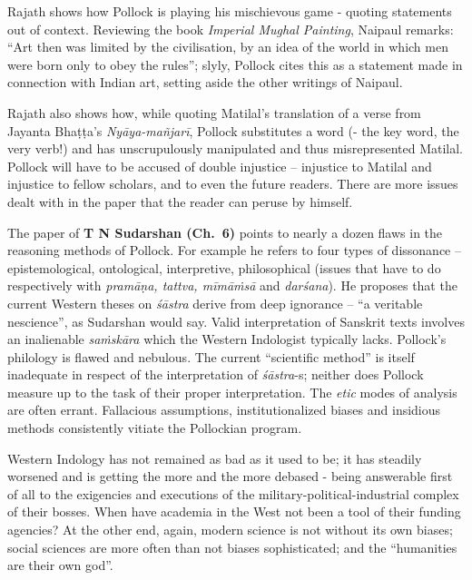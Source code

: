 Rajath shows how Pollock is playing his mischievous game - quoting statements out of context. Reviewing the book {\sl Imperial Mughal Painting}, Naipaul remarks: “Art then was limited by the civilisation, by an idea of the world in which men were born only to obey the rules”; slyly, Pollock cites this as a statement made in connection with Indian art, setting aside the other writings of Naipaul.

Rajath also shows how, while quoting Matilal’s translation of a verse from Jayanta Bhaṭṭa’s {\sl Nyāya-mañjarī}, Pollock substitutes a word (- the key word, the very verb!) and has unscrupulously manipulated and thus misrepresented Matilal. Pollock will have to be accused of double injustice -- injustice to Matilal and injustice to fellow scholars, and to even the future readers. There are more issues dealt with in the paper that the reader can peruse by himself.
\vskip 8pt

The paper of {\bf T N Sudarshan (Ch.~6)} points to nearly a dozen flaws in the reasoning methods of Pollock. For example he refers to four types of dissonance -- epistemological, ontological, interpretive, philosophical (issues that have to do respectively with {\sl pramāṇa, tattva, mīmāṁsā} and {\sl darśana}). He proposes that the current Western theses on {\sl śāstra} derive from deep ignorance -- “a veritable nescience”, as Sudarshan would say. Valid interpretation of Sanskrit texts involves an inalienable {\sl saṁskāra} which the Western Indologist typically lacks. Pollock’s philology is flawed and nebulous. The current “scientific method” is itself inadequate in respect of the interpretation of {\sl śāstra}-s; neither does Pollock measure up to the task of their proper interpretation. The {\sl etic} modes of analysis are often errant. Fallacious assumptions, institutionalized biases and insidious methods consistently vitiate the Pollockian program.

Western Indology has not remained as bad as it used to be; it has steadily worsened and is getting the more and the more debased - being answerable first of all to the exigencies and executions of the military-political-industrial complex of their bosses. When have academia in the West not been a tool of their funding agencies? At the other end, again, modern science is not without its own biases; social sciences are more often than not biases sophisticated; and the “humanities are their own god”.

